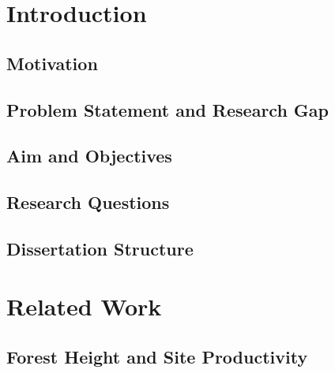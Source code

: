 \documentclass[logo,msc]{Original/infthesis}           %
\begin{document}
\chapter{Introduction}


\section{Motivation}

\section{Problem Statement and Research Gap}

\section{Aim and Objectives}

\section{Research Questions}

\section{Dissertation Structure}

\chapter{Related Work}

\section{Forest Height and Site Productivity}
\end{document}
